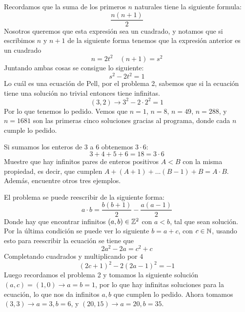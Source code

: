 \begin{sol}
	Recordamos que la suma de los primeros $n$ naturales tiene la siguiente formula:
	\[
		\frac{n(n+1)}2
	\]
	Nosotros queremos que esta expresión sea un cuadrado, y notamos que si escribimos $n$ y $n+1$ de la siguiente forma tenemos que la expresión anterior es un cuadrado
	\[
		n=2t^2\quad(n+1)=s^2
	\]
	Juntando ambas cosas se consigue lo siguiente:
	\[
		s^2-2t^2=1
	\]
	Lo cuál es una ecuación de Pell, por el problema 2, sabemos que si la ecuación tiene una solución no trivial entonces tiene infinitas.
	\[
		(3,2)\rightarrow 3^2-2\cdot2^2=1
	\]
	Por lo que tenemos lo pedido. Vemos que $n=1$, $n=8$, $n=49$, $n=288$, y $n=1681$ son las primeras cinco soluciones gracias al programa\cite{prog}, donde cada $n$ cumple lo pedido.
\end{sol}

\begin{prob}[3 pts]
	Si sumamos los enteros de $3$ a $6$ obtenemos $3\cdot 6$:
	\[3+4+5+6=18=3\cdot 6\]
	Muestre que hay infinitos pares de enteros positivos $A<B$ con la misma propiedad, es decir, que cumplen $A+(A+1)+...(B-1)+B=A\cdot B$. Además, encuentre otros tres ejemplos.
\end{prob}

\begin{sol}
	El problema se puede reescribir de la siguiente forma:
	\[
		a\cdot b=\frac{b(b+1)}2-\frac{a(a-1)}2
	\]
	Donde hay que encontrar infinitos $(a,b)\in\mathbb{Z}^2$ con $a<b$, tal que sean solución. Por la última condición se puede ver lo siguiente $b=a+c$, con $c\in\mathbb{N}$, usando esto para reescribir la ecuación se tiene que
	\[
		2a^2-2a=c^2+c
	\]
	Completando cuadrados y multiplicando por $4$
	\[
		(2c+1)^2-2(2a-1)^2=-1
	\]
	Luego recordamos el problema 2 y tomamos la siguiente solución $(a,c)=(1,0)\rightarrow a=b=1$, por lo que hay infinitas soluciones para la ecuación, lo que nos da infinitos $a,b$ que cumplen lo pedido. Ahora tomamos $(3,3)\rightarrow a=3, b=6$, y $(20,15)\rightarrow a=20, b=35$.
\end{sol}




